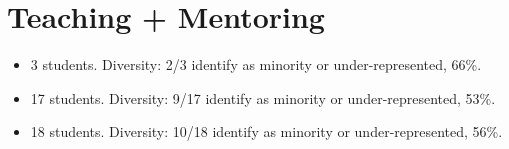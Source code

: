 \documentclass[letterpaper]{deedy-resume} %
\begin{document}
{%
%
%
%
%
%
%
%  
%  
%
%
%
%
%


\section{Teaching + Mentoring}

\vspace{0.2cm}

\begin{itemize}

\item {{} 3 students. Diversity: 2/3 identify as minority or under-represented, 66\%.}

\item {{} 17 students. Diversity: 9/17 identify as minority or under-represented, 53\%.}

\item {{} 18 students. Diversity: 10/18 identify as minority or under-represented, 56\%.}


\end{itemize}}
\end{document}
